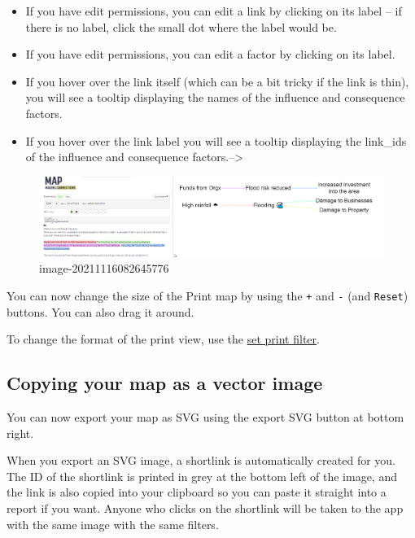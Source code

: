 \documentclass[
]{book}
\begin{document}
\begin{itemize}
\item
  If you have edit permissions, you can edit a link by clicking on its label -- if there is no label, click the small dot where the label would be.
\item
  If you have edit permissions, you can edit a factor by clicking on its label.
\item
  If you hover over the link itself (which can be a bit tricky if the link is thin), you will see a tooltip displaying the names of the influence and consequence factors.
\item
  If you hover over the link label you will see a tooltip displaying the link\_ids of the influence and consequence factors.--\textgreater{}
\end{itemize}

\begin{figure}
\centering
\includegraphics{_assets/image-20211116082645776.png}
\caption{image-20211116082645776}
\end{figure}

You can now change the size of the Print map by using the \texttt{+} and \texttt{-} (and \texttt{Reset}) buttons. You can also drag it around.

To change the format of the print view, use the \protect\hyperlink{xsimple-formats}{set print filter}.

\hypertarget{copy-svg}{%
\subsection{Copying your map as a vector image}\label{copy-svg}}

You can now export your map as SVG using the export SVG button at bottom right.

When you export an SVG image, a shortlink is automatically created for you. The ID of the shortlink is printed in grey at the bottom left of the image, and the link is also copied into your clipboard so you can paste it straight into a report if you want. Anyone who clicks on the shortlink will be taken to the app with the same image with the same filters.
\end{document}
